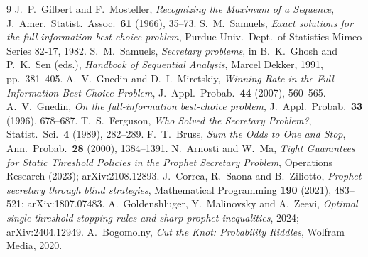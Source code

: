 \documentclass[11pt]{article}
\begin{document}
\begin{thebibliography}{9}
 J.~P.~Gilbert and F.~Mosteller, \emph{Recognizing the Maximum of a
  Sequence}, J.\ Amer.\ Statist.\ Assoc.\ \textbf{61} (1966), 35--73.
 S.~M.~Samuels, \emph{Exact solutions for the full information
  best choice problem}, Purdue Univ.\ Dept.\ of Statistics Mimeo Series 82-17, 1982.
 S.~M.~Samuels, \emph{Secretary problems}, in B.~K.~Ghosh and
  P.~K.~Sen (eds.), \emph{Handbook of Sequential Analysis}, Marcel Dekker, 1991,
  pp.~381--405.
 A.~V.~Gnedin and D.~I.~Miretskiy, \emph{Winning Rate in
  the Full-Information Best-Choice Problem}, J.\ Appl.\ Probab.\ \textbf{44} (2007),
  560--565.
 A.~V.~Gnedin, \emph{On the full-information best-choice problem},
  J.\ Appl.\ Probab.\ \textbf{33} (1996), 678--687.
 T.~S.~Ferguson, \emph{Who Solved the Secretary Problem?},
  Statist.\ Sci.\ \textbf{4} (1989), 282--289.
 F.~T.~Bruss, \emph{Sum the Odds to One and Stop}, Ann.\ Probab.\
  \textbf{28} (2000), 1384--1391.
 N.~Arnosti and W.~Ma, \emph{Tight Guarantees for Static
  Threshold Policies in the Prophet Secretary Problem}, Operations Research (2023);
  arXiv:2108.12893.
 J.~Correa, R.~Saona and B.~Ziliotto, \emph{Prophet secretary
  through blind strategies}, Mathematical Programming \textbf{190} (2021), 483--521;
  arXiv:1807.07483.
 A.~Goldenshluger, Y.~Malinovsky and A.~Zeevi, \emph{Optimal
  single threshold stopping rules and sharp prophet inequalities}, 2024; arXiv:2404.12949.
\bibitem{CutTheKnot} A.~Bogomolny, \emph{Cut the Knot: Probability Riddles}, Wolfram
  Media, 2020.
\end{thebibliography}
\end{document}
